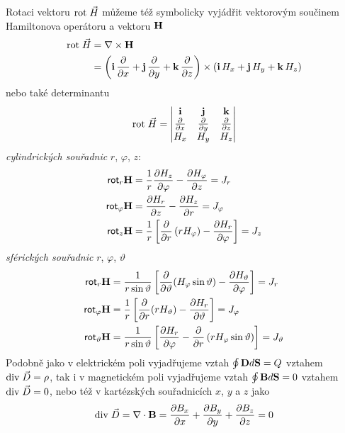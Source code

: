 {      Rotaci vektoru $\mathrm{rot}\;\vec{H}$ můžeme též symbolicky vyjádřit vektorovým součinem Hamiltonova
      operátoru a vektoru $\mathbf{H}$
      \begin{align*} %
        \rot{H}  &= \nabla\times\vr{H}                                                      \\
                 &= \left(\vr{i}\,\pder{ }{x} + 
                   \vr{j}\,\pder{ }{y} + \vr{k}\,\pder{ }{z}\right)\times(\vr{i}\,H_x +
                   \vr{j}\,H_y + \vr{k}\,H_z)
      \end{align*}
      nebo také determinantu
      \begin{equation}\label{TEMP:eq_amp_z8}
        \mathrm{rot}\;\vec{H} = \begin{vmatrix}
                    \mathbf{i}       & \mathbf{j}      & \mathbf{k}      \\
                    \frac{\partial  }{\partial x}  & \frac{\partial  }{\partial y} & \frac{\partial  }{\partial z} \\ 
                    H_x          & H_y         & H_z         \\
                  \end{vmatrix}      
      \end{equation}  
      \emph{cylindrických souřadnic} $r$, $\varphi$, $z$:
      \begin{align}\label{TEMP:eq_amp_z9}
        \textsf{rot}_r\mathbf{H}       
          &= \frac{1}{r}\frac{\partial H_z}{\partial \varphi} - \frac{\partial H_\varphi}{\partial z} = J_r           \nonumber \\ 
        \textsf{rot}_\varphi\mathbf{H} 
          &= \frac{\partial H_r}{\partial z} - \frac{\partial H_z}{\partial r}                        = J_\varphi     \nonumber \\
        \textsf{rot}_z\mathbf{H}       
          &= \frac{1}{r}\left[\frac{\partial  }{\partial r}
             \left(rH_\varphi\right)-\frac{\partial H_r}{\partial \varphi}\right]   = J_z
      \end{align} 
      \emph{sférických souřadnic} $r$, $\varphi$, $\vartheta$ 
      \begin{align}\label{TEMP:eq_amp_z10}
        \textsf{rot}_r\mathbf{H}        
           &= \frac{1}{r\sin\vartheta}\left[\frac{\partial  }{\partial \vartheta}(H_\varphi\sin\vartheta) - 
              \frac{\partial H_\vartheta}{\partial \varphi}\right]                     = J_r           \nonumber \\ 
        \textsf{rot}_\varphi\mathbf{H}   
           &= \frac{1}{r}\left[\frac{\partial  }{\partial r}(rH_\vartheta) - 
              \frac{\partial H_r}{\partial \vartheta}\right]                           = J_\varphi     \nonumber \\
        \textsf{rot}_\vartheta\mathbf{H} 
           &= \frac{1}{r\sin\vartheta}\left[\frac{\partial H_r}{\partial \varphi} -
              \frac{\partial  }{\partial r}\left(rH_\varphi\sin\vartheta\right)\right] = J_\vartheta    
    \end{align} 
      Podobně jako v elektrickém poli vyjadřujeme vztah $\oint\mathbf{D}d\mathbf{S} = Q$ vztahem $\mathrm{div}\;\vec{D}
      = \rho$, tak i v magnetickém poli vyjadřujeme vztah $\oint\mathbf{B}d\mathbf{S} = 0$ vztahem
      $\mathrm{div}\;\vec{D} = 0$, nebo též v kartézských souřadnicích $x$, $y$ a $z$ jako $$\mathrm{div}\;\vec{D} =
      \nabla\cdot\mathbf{B} = \frac{\partial B_x}{\partial x} + \frac{\partial B_y}{\partial y} + \frac{\partial B_z}{\partial z} = 0$$
                     
}
